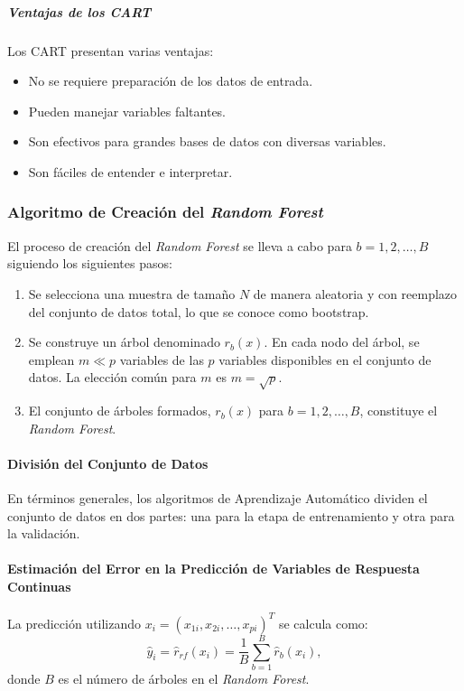 \subparagraph{Ventajas de los CART}
Los CART presentan varias ventajas:
\begin{itemize}
	\item No se requiere preparación de los datos de entrada.
	\item Pueden manejar variables faltantes.
	\item Son efectivos para grandes bases de datos con diversas variables.
	\item Son fáciles de entender e interpretar.
\end{itemize}

\subsubsection{Algoritmo de Creación del \textit{Random Forest}}\label{sec:algoritmo-creacion-rf}

El proceso de creación del \textit{Random Forest} se lleva a cabo para \(b = 1,2, \ldots, B\) siguiendo los siguientes pasos:
\begin{enumerate}
  \item Se selecciona una muestra de tamaño \(N\) de manera aleatoria y con reemplazo del conjunto de datos total, lo que se conoce como bootstrap.
  \item Se construye un árbol denominado \(r_b(x)\). En cada nodo del árbol, se emplean \(m \ll p\) variables de las \(p\) variables disponibles en el conjunto de datos. La elección común para \(m\) es \(m = \sqrt{p}\).
  \item El conjunto de árboles formados, \(r_b(x)\) para \(b = 1,2, \ldots, B\), constituye el \textit{Random Forest}.
\end{enumerate}

\paragraph{División del Conjunto de Datos}

En términos generales, los algoritmos de Aprendizaje Automático dividen el conjunto de datos en dos partes: una para la etapa de entrenamiento y otra para la validación.

\paragraph{Estimación del Error en la Predicción de Variables de Respuesta Continuas}

La predicción utilizando \(x_i = (x_{1i}, x_{2i}, \ldots, x_{pi})^T\) se calcula como:
\[ \hat{y}_i = \hat{r}_{rf}(x_i) = \frac{1}{B} \sum_{b=1}^{B} \hat{r}_b(x_i),\]
donde \(B\) es el número de árboles en el \textit{Random Forest}.

